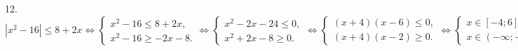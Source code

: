 12. $|x^2-16|\leqslant8+2x \Leftrightarrow \begin{cases} x^2-16\leqslant8+2x,\\ x^2-16\geqslant-2x-8.\end{cases} \Leftrightarrow
\begin{cases} x^2-2x-24\leqslant0,\\ x^2+2x-8\geqslant0.\end{cases}\Leftrightarrow\begin{cases} (x+4)(x-6)\leqslant0,\\ (x+4)(x-2)\geqslant0.\end{cases}
\Leftrightarrow\begin{cases} x\in[-4;6],\\ x\in(-\infty;-4]\cup[2;+\infty).\end{cases}\Leftrightarrow x\in\{-4\}\cup[2;6].$\\
